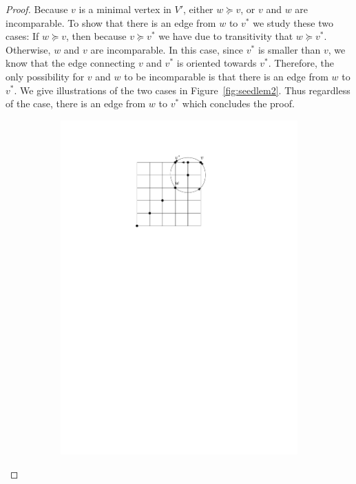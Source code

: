 \documentclass[a4paper,10pt]{article}
\begin{document}
\begin{proof}
   Because $v$ is a minimal vertex in $V'$, either $w\succeq v$, or $v$ and $w$ are incomparable. 
   To show that there is an edge from $w$ to $v^*$ we study these two cases: 
   If $w \succeq v$, then because $v \succeq v^*$ we have due to transitivity that $w \succeq v^*$. 
  Otherwise, $w$ and $v$ are incomparable. In this case, since $v^*$ is smaller than $v$, we know that the edge connecting $v$ and $v^*$ is  oriented towards $v^*$. 
  Therefore, the only possibility for $v$ and $w$ to be incomparable is that there is an edge from $w$ to $v^*$. 
  We give illustrations of the two cases in Figure~\ref{fig:seedlem2}. 
  Thus regardless of the case, there is an edge from $w$ to $v^*$ which concludes the proof.   
   \begin{figure}[htbp] 
       \centering
       \begin{subfigure}[b]{0.4\textwidth}
           \includegraphics[scale = 0.7]{seedlemma_fig2_cas1.pdf}

\end{subfigure}
\end{figure}
\end{proof}
\end{document}
